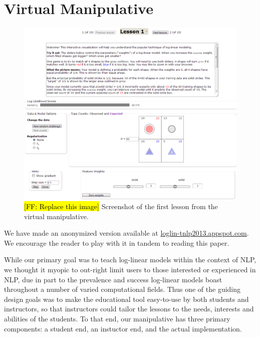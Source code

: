 \documentclass[11pt,letterpaper]{article}
\newcommand{\Note}[1]{}
\renewcommand{\Note}[1]{\hl{[#1]}}
\newcommand{\NoteSigned}[3]{{\sethlcolor{#2}\Note{#1: #3}}}
\newcommand{\NoteFF}[1]{\NoteSigned{FF}{LightBlue}{#1}}
\newcommand{\WhereToFind}[0]{\url{loglin-tnlp2013.appspot.com}}
\begin{document}
\section{Virtual Manipulative}\label{sec:overview}
\begin{figure}
\centering
\includegraphics[scale=.5]{images/lesson1-050913-intro.PNG}
\caption{\NoteFF{Replace this image} Screenshot of the first lesson from the virtual manipulative.}
\label{fig:lesson1}
\end{figure}

We have made an anonymized version available at \WhereToFind{}. 
We encourage the reader to play with it in tandem to reading this paper.

While our primary goal was to teach log-linear models within the context of NLP, 
we thought it myopic to out-right limit users to those interested or experienced 
in NLP, due in part to the prevalence and success log-linear models boast 
throughout a number of varied computational fields. Thus one of the guiding design 
goals was to make the educational tool easy-to-use by both students and instructors, 
so that instructors could tailor the lessons to the needs, interests and abilities of the 
students. To that end, our manipulative has three primary components: a student end, 
an instuctor end, and the actual implementation.
\end{document}
